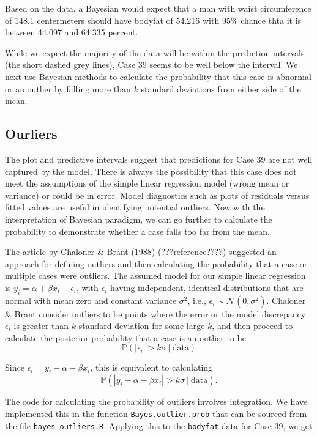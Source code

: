 \documentclass[]{book}
\theoremstyle{definition}
\theoremstyle{definition}
\theoremstyle{definition}
\theoremstyle{remark}
\begin{document}
Based on the data, a Bayesian would expect that a man with waist
circumference of 148.1 centermeters should have bodyfat of 54.216 with
95\% chance thta it is between 44.097 and 64.335 percent.

While we expect the majority of the data will be within the prediction
intervals (the short dashed grey lines), Case 39 seems to be well below
the interval. We next use Bayesian methods to calculate the probability
that this case is abnormal or an outlier by falling more than \(k\)
standard deviations from either side of the mean.

\subsection{Ourliers}\label{ourliers}

The plot and predictive intervals suggest that predictions for Case 39
are not well captured by the model. There is always the possibility that
this case does not meet the assumptions of the simple linear regression
model (wrong mean or variance) or could be in error. Model diagnostics
such as plots of residuals versus fitted values are useful in
identifying potential outliers. Now with the interpretation of Bayesian
paradigm, we can go further to calculate the probability to demonstrate
whether a case falls too far from the mean.

The article by Chaloner \& Brant (1988) (???reference????) suggested an
approach for defining outliers and then calculating the probability that
a case or multiple cases were outliers. The assumed model for our simple
linear regression is \(y_i=\alpha + \beta x_i+\epsilon_i\), with
\(\epsilon_i\) having independent, identical distributions that are
normal with mean zero and constant variance \(\sigma^2\), i.e.,
\(\epsilon_i \sim \mathcal{N}(0, \sigma^2)\). Chaloner \& Brant consider
outliers to be points where the error or the model discrepancy
\(\epsilon_i\) is greater than \(k\) standard deviation for some large
\(k\), and then proceed to calculate the posterior probability that a
case is an outlier to be
\[ \mathbb{P}(|\epsilon_i| > k\sigma ~|~\text{data}) \]

Since \(\epsilon_i = y_i - \alpha-\beta x_i\), this is equivalent to
calculating
\[ \mathbb{P}(|y_i-\alpha-\beta x_i| > k\sigma~|~\text{data}).\]

The code for calculating the probability of outliers involves
integration. We have implemented this in the function
\texttt{Bayes.outlier.prob} that can be sourced from the file
\texttt{bayes-outliers.R}. Applying this to the \texttt{bodyfat} data
for Case 39, we get
\end{document}
